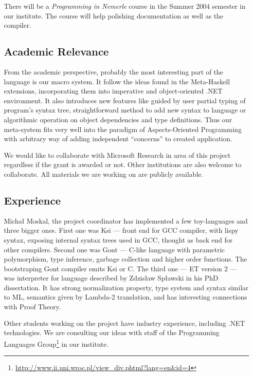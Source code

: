 \documentclass[a4paper,11pt]{article}
\begin{document}
There will be a \textit{Programming in Nemerle} course in the Summer
2004 semester in our institute.  The course will help polishing 
documentation as well as the compiler.


\subsection{Academic Relevance}
From the academic perspective, probably the most interesting part of
the language is our macro system. It follow the ideas found in the
Meta-Haskell \cite{MetaHaskell} extensions, incorporating them into
imperative and object-oriented .NET environment. It also introduces new
features like guided by user partial typing of program's syntax tree,
straightforward method to add new syntax to language or algorithmic
operation on object dependencies and type definitions. Thus our meta-system
fits very well into the paradigm of Aspects-Oriented Programming
with arbitrary way of adding independent ``concerns'' to created
application.

We would like to collaborate with Microsoft Research in area of this
project regardless if the grant is awarded or not. Other institutions 
are also welcome to collaborate. All materials we are working on are 
publicly available.



\subsection{Experience}

Micha{\l} Moskal, the project coordinator has implemented a few
toy-languages and three bigger ones. First one was Ksi --- front end for
GCC compiler, with lispy syntax, exposing internal syntax trees used in
GCC, thought as back end for other compilers.  Second one was Gont ---
C-like language with parametric polymorphism, type inference, garbage
collection and higher order functions. The bootstraping Gont compiler
emits Ksi or C. The third one --- ET version 2 --- was interpreter for
language described by Zdzis{\l}aw Sp{\l}awski in his PhD dissertation.
It has strong normalization property, type system and syntax similar to ML,
semantics given by Lambda-2 translation, and has interesting connections
with Proof Theory.

Other students working on the project have industry experience, including
.NET technologies. We are consulting our ideas with staff of the Programming 
Languages 
Group\footnote{\url{http://www.ii.uni.wroc.pl/view_div.phtml?lang=en&id=4}}
in our institute.
\end{document}
